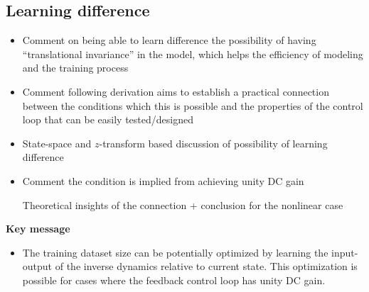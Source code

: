 \subsection{Learning difference}
\begin{itemize}
\color{grey1}
\item Comment on being able to learn difference the possibility of having ``translational invariance'' in the model, which helps the efficiency of modeling and the training process
\item Comment following derivation aims to establish a practical connection between the conditions which this is possible and the properties of the control loop that can be easily tested/designed
\item State-space and $z$-transform based discussion of possibility of learning difference
\item Comment the condition is implied from achieving unity DC gain

\todo Theoretical insights of the connection + conclusion for the nonlinear case
\end{itemize}

\textbf{Key message}
\begin{itemize}
\item The training dataset size can be potentially optimized by learning the input-output of the inverse dynamics relative to current state. This optimization is possible for cases where the feedback control loop has unity DC gain.
\end{itemize}



